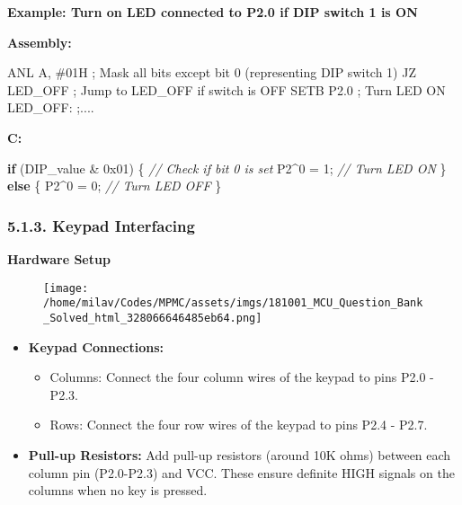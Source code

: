 \documentclass[
]{article}
\newenvironment{Shaded}{}{}
\newcommand{\BaseNTok}[1]{\textcolor[rgb]{0.25,0.63,0.44}{#1}}
\newcommand{\CommentTok}[1]{\textcolor[rgb]{0.38,0.63,0.69}{\textit{#1}}}
\newcommand{\ControlFlowTok}[1]{\textcolor[rgb]{0.00,0.44,0.13}{\textbf{#1}}}
\newcommand{\DecValTok}[1]{\textcolor[rgb]{0.25,0.63,0.44}{#1}}
\newcommand{\NormalTok}[1]{#1}
\newcommand{\OperatorTok}[1]{\textcolor[rgb]{0.40,0.40,0.40}{#1}}
\begin{document}
\textbf{Example: Turn on LED connected to P2.0 if DIP switch 1 is ON}

\textbf{Assembly:}

\begin{Shaded}
\begin{Highlighting}[]
\NormalTok{ANL A, \#01H   ; Mask all bits except bit 0 (representing DIP switch 1)}
\NormalTok{JZ LED\_OFF    ; Jump to LED\_OFF if switch is OFF}
\NormalTok{SETB P2.0     ; Turn LED ON}
\NormalTok{LED\_OFF:}
\NormalTok{   ;....}
\end{Highlighting}
\end{Shaded}

\textbf{C:}

\begin{Shaded}
\begin{Highlighting}[]
\ControlFlowTok{if} \OperatorTok{(}\NormalTok{DIP\_value }\OperatorTok{\&} \BaseNTok{0x01}\OperatorTok{)} \OperatorTok{\{} \CommentTok{// Check if bit 0 is set}
\NormalTok{    P2}\OperatorTok{\^{}}\DecValTok{0} \OperatorTok{=} \DecValTok{1}\OperatorTok{;}  \CommentTok{// Turn LED ON}
\OperatorTok{\}} \ControlFlowTok{else} \OperatorTok{\{}
\NormalTok{    P2}\OperatorTok{\^{}}\DecValTok{0} \OperatorTok{=} \DecValTok{0}\OperatorTok{;}  \CommentTok{// Turn LED OFF}
\OperatorTok{\}}
\end{Highlighting}
\end{Shaded}

\hypertarget{513-keypad-interfacing}{%
\subsubsection{5.1.3. Keypad Interfacing}\label{513-keypad-interfacing}}

\textbf{Hardware Setup}

\begin{figure}
\centering
\texttt{[image: /home/milav/Codes/MPMC/assets/imgs/181001\_MCU\_Question\_Bank\_Solved\_html\_328066646485eb64.png]}
\caption{}
\end{figure}

\begin{itemize}
\item
  \textbf{Keypad Connections:}

  \begin{itemize}
  \item
    Columns: Connect the four column wires of the keypad to pins P2.0 -
    P2.3.
  \item
    Rows: Connect the four row wires of the keypad to pins P2.4 - P2.7.
  \end{itemize}
\item
  \textbf{Pull-up Resistors:} Add pull-up resistors (around 10K ohms)
  between each column pin (P2.0-P2.3) and VCC. These ensure definite
  HIGH signals on the columns when no key is pressed.
\end{itemize}
\end{document}

